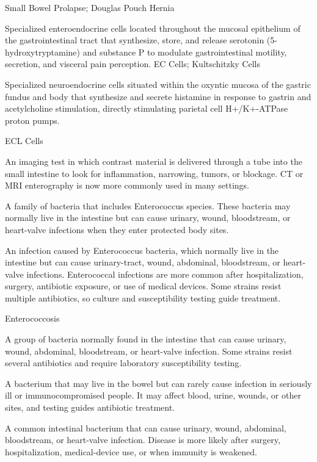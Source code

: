 \synonyms
Small Bowel Prolapse; Douglas Pouch Hernia

 Specialized enteroendocrine cells located throughout the mucosal epithelium of the gastrointestinal tract that synthesize, store, and release serotonin (5-hydroxytryptamine) and substance P to modulate gastrointestinal motility, secretion, and visceral pain perception.
\synonyms
EC Cells; Kultschitzky Cells

 Specialized neuroendocrine cells situated within the oxyntic mucosa of the gastric fundus and body that synthesize and secrete histamine in response to gastrin and acetylcholine stimulation, directly stimulating parietal cell H+/K+-ATPase proton pumps.

\synonyms
ECL Cells

 An imaging test in which contrast material is delivered through a tube into the small intestine to look for inflammation, narrowing, tumors, or blockage. CT or MRI enterography is now more commonly used in many settings.

 A family of bacteria that includes Enterococcus species. These bacteria may normally live in the intestine but can cause urinary, wound, bloodstream, or heart-valve infections when they enter protected body sites.

 An infection caused by Enterococcus bacteria, which normally live in the intestine but can cause urinary-tract, wound, abdominal, bloodstream, or heart-valve infections. Enterococcal infections are more common after hospitalization, surgery, antibiotic exposure, or use of medical devices. Some strains resist multiple antibiotics, so culture and susceptibility testing guide treatment.

\synonyms
Enterococcosis

 A group of bacteria normally found in the intestine that can cause urinary, wound, abdominal, bloodstream, or heart-valve infection. Some strains resist several antibiotics and require laboratory susceptibility testing.

 A bacterium that may live in the bowel but can rarely cause infection in seriously ill or immunocompromised people. It may affect blood, urine, wounds, or other sites, and testing guides antibiotic treatment.

 A common intestinal bacterium that can cause urinary, wound, abdominal, bloodstream, or heart-valve infection. Disease is more likely after surgery, hospitalization, medical-device use, or when immunity is weakened.

